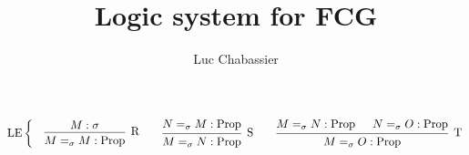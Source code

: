 \documentclass[]{article}
\newcommand{\1}{\mathbbm{1}}
\newcommand{\0}{\mathbbm{0}}
\newcommand{\Prop}{\text{Prop}}
\begin{document}
\title{Logic system for FCG}
\author{Luc Chabassier}
\maketitle

\[\text{LE}\left\{
\quad\begin{prooftree}
    \hypo{M : \sigma}
    \infer1[R]{M =_\sigma M : \Prop}
\end{prooftree}
\qquad\begin{prooftree}
    \hypo{ N =_\sigma M : \Prop }
    \infer1[S]{M =_\sigma N : \Prop}
\end{prooftree}
\qquad\begin{prooftree}
    \hypo{M=_\sigma N : \Prop}
    \hypo{N=_\sigma O : \Prop}
    \infer2[T]{M=_\sigma O : \Prop}
\end{prooftree}
\right.
\]
\end{document}
